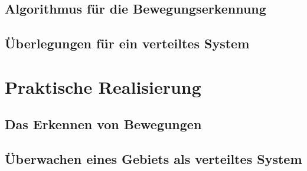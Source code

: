 \message{ !name(Verteilte Überwachung.tex)}\documentclass[12pt,a4paper]{scrreprt}
\begin{document}
\section{Algorithmus für die Bewegungserkennung}


\section{Überlegungen für ein verteiltes System}


\chapter{Praktische Realisierung}

\section{Das Erkennen von Bewegungen}


\section{Überwachen eines Gebiets als verteiltes System}


\printbibliography
\end{document}
